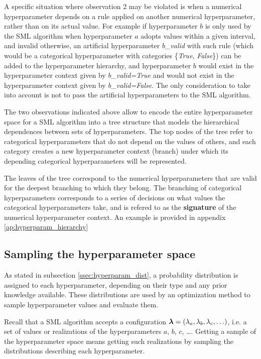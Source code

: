 	A specific situation where observation 2 may be violated is when a numerical hyperparameter depends
	on a rule applied on another numerical hyperparameter, rather than on its actual value. For
	example if hyperparameter $b$ is only used by the SML algorithm when hyperparameter $a$ adopts
	values within a given interval, and invalid otherwise, an artificial hyperparameter \emph{$b$\_valid} with such rule
	(which would be a categorical hyperparameter with categories \{\emph{True}, \emph{False}\}) can be added to the
	hyperparameter hierarchy, and hyperparameter $b$ would exist in the hyperparameter context given
	by \emph{$b$\_valid=True} and would not exist in the hyperparameter context given by
	\emph{$b$\_valid=False}. The only consideration to take into account is not to pass the
	artificial hyperparameters to the SML algorithm.

	The two observations indicated above allow to encode the entire hyperparameter space for a SML
	algorithm into a tree structure that models the hierarchical dependences between sets of
	hyperparameters. The top nodes of the tree refer to categorical hyperparameters that do not
	depend on the values of others, and each category creates a new hyperparameter context (branch)
	under which its depending categorical hyperparameters will be represented.
	
	The leaves of the tree correspond to the numerical hyperparameters that are valid for the
	deepest branching to which they belong. The branching of categorical hyperparameters corresponds to a
	series of decisions on what values the categorical hyperparameters take, and is refered to as
	the {\bf signature} of the numerical hyperparameter context. An example is provided in appendix
	\ref{ap:hyperparam_hierarchy}

	\subsection{Sampling the hyperparameter space}
	\label{ssec:sampling}
	As stated in subsection \ref{ssec:hyperparam_dist}, a probability distribution is assigned to
	each hyperparameter, depending on their type and any prior knowledge available. These
	distributions are used by an optimization method to sample hyperparameter values and evaluate
	them.

	Recall that a SML algorithm accepts a configuration $\boldsymbol{\lambda} = (\lambda_a, \lambda_b,
	\lambda_c, \ldots)$, i.e. a set of values or realizations of the hyperparameters $a$, $b$,
	$c$, \ldots. Getting a sample of the hyperparameter space means getting such realizations by
	sampling the distributions describing each hyperparameter.

